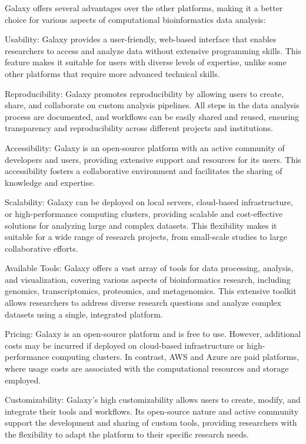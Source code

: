             Galaxy offers several advantages over the other platforms, making it a better choice for various aspects of computational bioinformatics data analysis:
            
            Usability: Galaxy provides a user-friendly, web-based interface that enables researchers to access and analyze data without extensive programming skills. This feature makes it suitable for users with diverse levels of expertise, unlike some other platforms that require more advanced technical skills.
            
            Reproducibility: Galaxy promotes reproducibility by allowing users to create, share, and collaborate on custom analysis pipelines. All steps in the data analysis process are documented, and workflows can be easily shared and reused, ensuring transparency and reproducibility across different projects and institutions.
            
            Accessibility: Galaxy is an open-source platform with an active community of developers and users, providing extensive support and resources for its users. This accessibility fosters a collaborative environment and facilitates the sharing of knowledge and expertise.
            
            Scalability: Galaxy can be deployed on local servers, cloud-based infrastructure, or high-performance computing clusters, providing scalable and cost-effective solutions for analyzing large and complex datasets. This flexibility makes it suitable for a wide range of research projects, from small-scale studies to large collaborative efforts.
            
            Available Tools: Galaxy offers a vast array of tools for data processing, analysis, and visualization, covering various aspects of bioinformatics research, including genomics, transcriptomics, proteomics, and metagenomics. This extensive toolkit allows researchers to address diverse research questions and analyze complex datasets using a single, integrated platform.

            Pricing: Galaxy is an open-source platform and is free to use. However, additional costs may be incurred if deployed on cloud-based infrastructure or high-performance computing clusters. In contrast, AWS and Azure are paid platforms, where usage costs are associated with the computational resources and storage employed.

            Customizability: Galaxy's high customizability allows users to create, modify, and integrate their tools and workflows. Its open-source nature and active community support the development and sharing of custom tools, providing researchers with the flexibility to adapt the platform to their specific research needs. 

